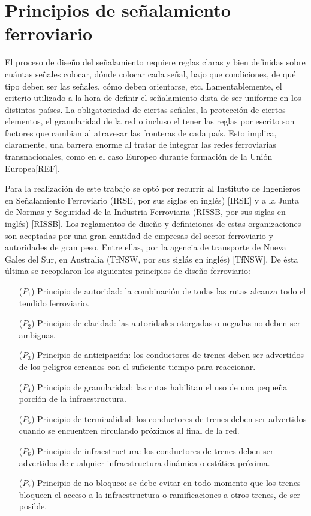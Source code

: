 \section{Principios de señalamiento ferroviario}
    \label{sec:principios}
    
    El proceso de diseño del señalamiento requiere reglas claras y bien definidas sobre cuántas señales colocar, dónde colocar cada señal, bajo que condiciones, de qué tipo deben ser las señales, cómo deben orientarse, etc. Lamentablemente, el criterio utilizado a la hora de definir el señalamiento dista de ser uniforme en los distintos países. La obligatoriedad de ciertas señales, la protección de ciertos elementos, el granularidad de la red o incluso el tener las reglas por escrito son factores que cambian al atravesar las fronteras de cada país. Esto implica, claramente, una barrera enorme al tratar de integrar las redes ferroviarias transnacionales, como en el caso Europeo durante formación de la Unión Europea[REF].
    
    Para la realización de este trabajo se optó por recurrir al Instituto de Ingenieros en Señalamiento Ferroviario (IRSE, por sus siglas en inglés) [IRSE] y a la Junta de Normas y Seguridad de la Industria Ferroviaria (RISSB, por sus siglas en inglés) [RISSB]. Los reglamentos de diseño y definiciones de estas organizaciones son aceptadas por una gran cantidad de empresas del sector ferroviario y autoridades de gran peso. Entre ellas, por la agencia de transporte de Nueva Gales del Sur, en Australia (TfNSW, por sus siglás en inglés) [TfNSW]. De ésta última se recopilaron los siguientes principios de diseño ferroviario:
    
    \begin{itemize}
        \item [($P_1$)] Principio de autoridad: la combinación de todas las rutas alcanza todo el tendido ferroviario.
        \item [($P_2$)] Principio de claridad: las autoridades otorgadas o negadas no deben ser ambiguas. 
        \item [($P_3$)] Principio de anticipación: los conductores de trenes deben ser advertidos de los peligros cercanos con el suficiente tiempo para reaccionar.
        \item [($P_4$)] Principio de granularidad: las rutas habilitan el uso de una pequeña porción de la infraestructura.
        \item [($P_5$)] Principio de terminalidad: los conductores de trenes deben ser advertidos cuando se encuentren circulando próximos al final de la red.
        \item [($P_6$)] Principio de infraestructura: los conductores de trenes deben ser advertidos de cualquier infraestructura dinámica o estática próxima.
        \item [($P_7$)] Principio de no bloqueo: se debe evitar en todo momento que los trenes bloqueen el acceso a la infraestructura o ramificaciones a otros trenes, de ser posible.
    \end{itemize}


